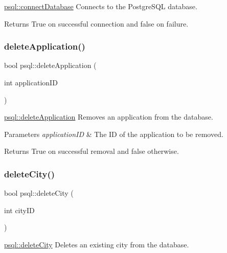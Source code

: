 \hyperlink{classpsql_ada485c933df77453629e3821ab19fa4c}{psql\+::connect\+Database} Connects to the Postgre\+S\+QL database. 

\begin{DoxyReturn}{Returns}
True on successful connection and false on failure. 
\end{DoxyReturn}
\mbox{\label{classpsql_a999ee8e2d813892411ef502ebc055a79}} 
\subsubsection{\texorpdfstring{delete\+Application()}{deleteApplication()}}
{\footnotesize\ttfamily bool psql\+::delete\+Application (\begin{DoxyParamCaption}\item[{int}]{application\+ID }\end{DoxyParamCaption})}



\hyperlink{classpsql_a999ee8e2d813892411ef502ebc055a79}{psql\+::delete\+Application} Removes an application from the database. 


\begin{DoxyParams}{Parameters}
{\em application\+ID} & The ID of the application to be removed. \\
\hline
\end{DoxyParams}
\begin{DoxyReturn}{Returns}
True on successful removal and false otherwise. 
\end{DoxyReturn}
\mbox{\label{classpsql_aaffd42b26b635d9881daaf5fbf4fd62f}} 
\subsubsection{\texorpdfstring{delete\+City()}{deleteCity()}}
{\footnotesize\ttfamily bool psql\+::delete\+City (\begin{DoxyParamCaption}\item[{int}]{city\+ID }\end{DoxyParamCaption})}



\hyperlink{classpsql_aaffd42b26b635d9881daaf5fbf4fd62f}{psql\+::delete\+City} Deletes an existing city from the database. 


